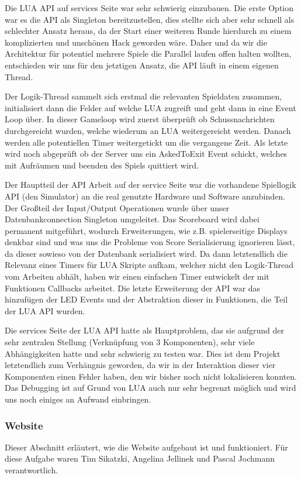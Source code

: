 Die LUA API auf services Seite war sehr schwierig einzubauen. Die erste Option war es die API als Singleton bereitzustellen, dies stellte sich aber sehr schnell als schlechter Ansatz heraus, da der Start einer weiteren Runde hierdurch zu einem komplizierten und unschönen Hack geworden wäre. Daher und da wir die Architektur für potentiel mehrere Spiele die Parallel laufen offen halten wollten, entschieden wir uns für den jetztigen Ansatz, die API läuft in einem eigenen Thread. 

Der Logik-Thread sammelt sich erstmal die relevanten Spieldaten zusammen, initialisiert dann die Felder auf welche LUA zugreift und geht dann in eine Event Loop über. In dieser Gameloop wird zuerst überprüft ob Schussnachrichten durchgereicht wurden, welche wiederum an LUA weitergereicht werden. Danach werden alle potentiellen Timer weitergetickt um die vergangene Zeit. Als letzte wird noch abgeprüft ob der Server uns ein AskedToExit Event schickt, welches mit Aufräumen und beenden des Spiels quittiert wird.

Der Hauptteil der API Arbeit auf der service Seite war die vorhandene Spiellogik API (den Simulator) an die real genutzte Hardware und Software anzubinden. Der Großteil der Input/Output Operationen wurde über unser Datenbankconnection Singleton umgeleitet. Das Scoreboard wird dabei permanent mitgeführt, wodurch Erweiterungen, wie z.B. spielerseitige Displays denkbar sind und was uns die Probleme von Score Serialisierung ignorieren lässt, da dieser sowieso von der Datenbank serialisiert wird. Da dann letztendlich die Relevanz eines Timers für LUA Skripte aufkam, welcher nicht den Logik-Thread vom Arbeiten abhält, haben wir einen einfachen Timer entwickelt der mit Funktionen Callbacks arbeitet. Die letzte Erweiterung der API war das hinzufügen der LED Events und der Abstraktion dieser in Funktionen, die Teil der LUA API wurden.

Die services Seite der LUA API hatte als Hauptproblem, das sie aufgrund der sehr zentralen Stellung (Verknüpfung von 3 Komponenten), sehr viele Abhängigkeiten hatte und sehr schwierig zu testen war. Dies ist dem Projekt letztendlich zum Verhängnis geworden, da wir in der Interaktion dieser vier Komponenten einen Fehler haben, den wir bisher noch nicht lokalisieren konnten. Das Debugging ist auf Grund von LUA auch nur sehr begrenzt möglich und wird uns noch einiges an Aufwand einbringen.
\subsubsection{Website}
Dieser Abschnitt erläutert, wie die Website aufgebaut ist und funktioniert. Für diese Aufgabe waren Tim Sikatzki, Angelina Jellinek und Pascal Jochmann verantwortlich.

